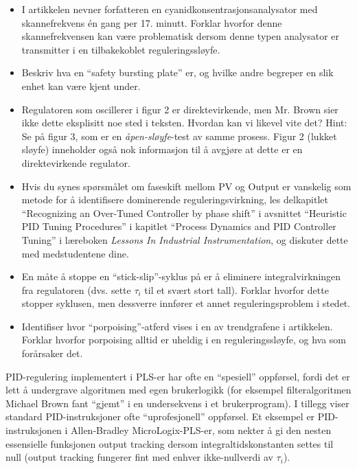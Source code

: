 \begin{itemize}
\item{} I artikkelen nevner forfatteren en cyanidkonsentrasjonsanalysator med skannefrekvens én gang per 17. minutt. Forklar hvorfor denne skannefrekvensen kan være problematisk dersom denne typen analysator er transmitter i en tilbakekoblet reguleringssløyfe.
\item{} Beskriv hva en ``safety bursting plate'' er, og hvilke andre begreper en slik enhet kan være kjent under.
\item{} Regulatoren som oscillerer i figur 2 er direktevirkende, men Mr. Brown sier ikke dette eksplisitt noe sted i teksten. Hvordan kan vi likevel vite det? Hint: Se på figur 3, som er en {\it åpen-sløyfe}-test av samme prosess. Figur 2 (lukket sløyfe) inneholder også nok informasjon til å avgjøre at dette er en direktevirkende regulator.
\item{} Hvis du synes spørsmålet om faseskift mellom PV og Output er vanskelig som metode for å identifisere dominerende reguleringsvirkning, les delkapitlet ``Recognizing an Over-Tuned Controller by phase shift'' i avsnittet ``Heuristic PID Tuning Procedures'' i kapitlet ``Process Dynamics and PID Controller Tuning'' i læreboken {\it Lessons In Industrial Instrumentation}, og diskuter dette med medstudentene dine.
\item{} En måte å stoppe en ``stick-slip''-syklus på er å eliminere integralvirkningen fra regulatoren (dvs. sette $\tau_i$ til et svært stort tall). Forklar hvorfor dette stopper syklusen, men dessverre innfører et annet reguleringsproblem i stedet.
\item{} Identifiser hvor ``porpoising''-atferd vises i en av trendgrafene i artikkelen. Forklar hvorfor porpoising alltid er uheldig i en reguleringssløyfe, og hva som forårsaker det.
\end{itemize}














PID-regulering implementert i PLS-er har ofte en ``spesiell'' oppførsel, fordi det er lett å undergrave algoritmen med egen brukerlogikk (for eksempel filteralgoritmen Michael Brown fant ``gjemt'' i en undersekvens i et brukerprogram). I tillegg viser standard PID-instruksjoner ofte ``uprofesjonell'' oppførsel. Et eksempel er PID-instruksjonen i Allen-Bradley MicroLogix-PLS-er, som nekter å gi den nesten essensielle funksjonen output tracking dersom integraltidskonstanten settes til null (output tracking fungerer fint med enhver ikke-nullverdi av $\tau_i$).

